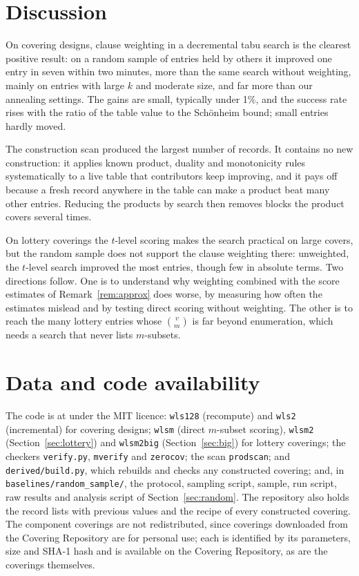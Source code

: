 \documentclass[11pt]{article}
\theoremstyle{remark}
\begin{document}
\section{Discussion}\label{sec:discussion}

On covering designs, clause weighting in a decremental tabu search is the clearest positive result: on a random sample
of entries held by others it improved one entry in seven within two minutes, more than the same search without
weighting, mainly on entries with large $k$ and moderate size, and far more than our annealing settings. The gains are
small, typically under 1\%, and the success rate rises with the ratio of the table value to the Sch\"onheim bound;
small entries hardly moved.

The construction scan produced the largest number of records. It contains no new
construction: it applies known product, duality and monotonicity rules \cite{gkp1995,montecalvo2012} systematically to
a live table that contributors keep improving, and it pays off because a fresh record anywhere in the table can make
a product beat many other entries. Reducing the products by search then removes blocks the product covers several
times.

On lottery coverings the $t$-level scoring makes the search practical on large covers, but the random sample does not
support the clause weighting there: unweighted, the $t$-level search improved the most entries, though few in absolute
terms. Two directions follow. One is to understand why weighting combined with the score estimates of
Remark~\ref{rem:approx} does worse, by measuring how often the estimates mislead and by testing direct scoring
without weighting. The other is to reach the many lottery entries whose $\binom{v}{m}$ is far beyond enumeration, which
needs a search that never lists $m$-subsets.

\section*{Data and code availability}

\begin{sloppypar}
The code is at \cite{repo} under the MIT licence: \texttt{wls128} (recompute) and \texttt{wls2} (incremental) for
covering designs; \texttt{wlsm} (direct $m$-subset scoring), \texttt{wlsm2} (Section~\ref{sec:lottery}) and
\texttt{wlsm2big} (Section~\ref{sec:big}) for lottery coverings; the checkers \texttt{verify.py}, \texttt{mverify} and
\texttt{zerocov}; the scan \texttt{prodscan}; and \texttt{derived/build.py}, which rebuilds and checks any constructed
covering; and, in \texttt{baselines/random\_sample/}, the protocol, sampling script, sample, run script, raw results
and analysis script of Section~\ref{sec:random}. The repository also holds the record lists with previous values and the recipe of every constructed
covering. The component coverings are not redistributed, since coverings downloaded from the Covering Repository are
for personal use; each is identified by its parameters, size and SHA-1 hash and is available on the Covering
Repository, as are the coverings themselves.
\end{sloppypar}
\end{document}
